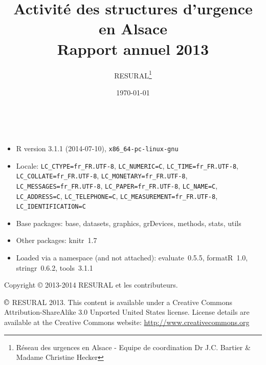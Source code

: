 \documentclass[12pt,english,french,twoside]{book}\usepackage[]{graphicx}\usepackage[]{color}
\begin{document}


\frontmatter

\title{Activité des structures d'urgence en Alsace \\Rapport annuel 2013}
\author{RESURAL\thanks{Réseau des urgences en Alsace - Equipe de coordination Dr J.C.
Bartier \& Madame Christine Hecker}}
\date{\today}
\maketitle


%

\newpage
~\vfill

\begin{itemize}\raggedright
  \item R version 3.1.1 (2014-07-10), \verb|x86_64-pc-linux-gnu|
  \item Locale: \verb|LC_CTYPE=fr_FR.UTF-8|, \verb|LC_NUMERIC=C|, \verb|LC_TIME=fr_FR.UTF-8|, \verb|LC_COLLATE=fr_FR.UTF-8|, \verb|LC_MONETARY=fr_FR.UTF-8|, \verb|LC_MESSAGES=fr_FR.UTF-8|, \verb|LC_PAPER=fr_FR.UTF-8|, \verb|LC_NAME=C|, \verb|LC_ADDRESS=C|, \verb|LC_TELEPHONE=C|, \verb|LC_MEASUREMENT=fr_FR.UTF-8|, \verb|LC_IDENTIFICATION=C|
  \item Base packages: base, datasets, graphics, grDevices,
    methods, stats, utils
  \item Other packages: knitr~1.7
  \item Loaded via a namespace (and not attached): evaluate~0.5.5,
    formatR~1.0, stringr~0.6.2, tools~3.1.1
\end{itemize}


Copyright \copyright{} 2013-2014 RESURAL et les contributeurs.

\noindent $\copyright$ RESURAL 2013. This content is available under a Creative Commons Attribution-ShareAlike 3.0 Unported United States license. License details are available at the Creative Commons website: \url{http://www.creativecommons.org} \\
\end{document}
